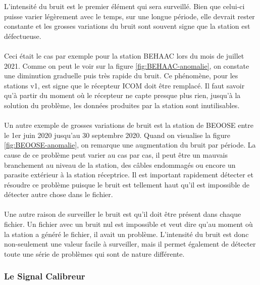 \documentclass[11pt]{article}
\begin{document}
L'intensité du bruit est le premier élément qui sera surveillé.
Bien que celui-ci puisse varier légèrement avec le temps, sur une longue période, elle devrait rester constante et les grosses variations du bruit sont souvent signe que la station est défectueuse.\\
\\
Ceci était le cas par exemple pour la station BEHAAC lors du mois de juillet 2021.
Comme on peut le voir sur la figure \ref{fig:BEHAAC-anomalie}, on constate une diminution graduelle puis très rapide du bruit.
Ce phénomène, pour les stations v1, est signe que le récepteur ICOM doit être remplacé.
Il faut savoir qu'à partir du moment où le récepteur ne capte presque plus rien, jusqu'à la solution du problème, les données produites par la station sont inutilisables.\\
\\
Un autre exemple de grosses variations de bruit est la station de BEOOSE entre le 1er juin 2020 jusqu'au 30 septembre 2020.
Quand on visualise la figure \ref{fig:BEOOSE-anomalie}, on remarque une augmentation du bruit par période.
La cause de ce problème peut varier au cas par cas, il peut être un mauvais branchement au niveau de la station, des câbles endommagés ou encore un parasite extérieur à la station réceptrice.
Il est important rapidement détecter et résoudre ce problème puisque le bruit est tellement haut qu'il est impossible de détecter autre chose dans le fichier.\\
\\
Une autre raison de surveiller le bruit est qu'il doit être présent dans chaque fichier.
Un fichier avec un bruit nul est impossible et veut dire qu'au moment où la station a généré le fichier, il avait un problème.
L'intensité du bruit est donc non-seulement une valeur facile à surveiller, mais il permet également de détecter toute une série de problèmes qui sont de nature différente.

\subsubsection{Le Signal Calibreur}
\end{document}
